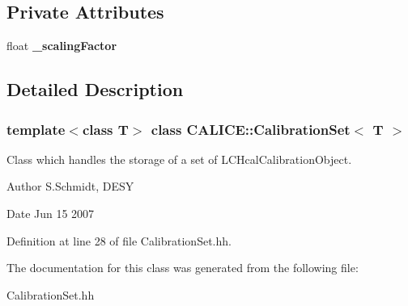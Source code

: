 \subsection*{Private Attributes}
\begin{DoxyCompactItemize}
\item 
float {\bfseries \_\-scalingFactor}\label{classCALICE_1_1CalibrationSet_a6e4301d0f06d4afd7747c55cc1d72755}

\end{DoxyCompactItemize}


\subsection{Detailed Description}
\subsubsection*{template$<$class T$>$ class CALICE::CalibrationSet$<$ T $>$}

Class which handles the storage of a set of LCHcalCalibrationObject. \begin{DoxyAuthor}{Author}
S.Schmidt, DESY 
\end{DoxyAuthor}
\begin{DoxyDate}{Date}
Jun 15 2007 
\end{DoxyDate}


Definition at line 28 of file CalibrationSet.hh.

The documentation for this class was generated from the following file:\begin{DoxyCompactItemize}
\item 
CalibrationSet.hh\end{DoxyCompactItemize}
